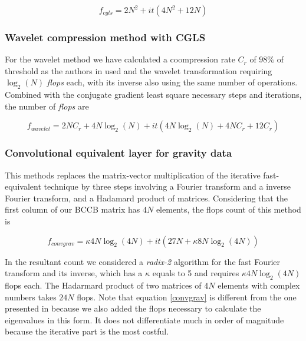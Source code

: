 \begin{equation}
	f_{cgls} = 2N^2 + it(4N^2 + 12N)
\label{cgls}
\end{equation}

\subsubsection{Wavelet compression method with CGLS \citep{li-oldenburg2010}}

For the wavelet method we have calculated a coompression rate $C_r$ of $98\%$ of threshold as the authors in \cite{li-oldenburg2010} used and the wavelet transformation requiring $\log_2(N)$ \textit{flops} each, with its inverse also using the same number of operations. Combined with the conjugate gradient least square necessary steps and iterations, the number of \textit{flops} are

\begin{equation}
	f_{wavelet} = 2NC_r + 4N\log_2(N) + it(4N\log_2(N) + 4NC_r + 12C_r)
\label{wavelet}
\end{equation}

\subsubsection{Convolutional equivalent layer for gravity data \citep{takahashi2020}}

This methods replaces the matrix-vector multiplication of the iterative fast-equivalent technique \citep{siqueira-etal2017} by three steps involving a Fourier transform and a inverse Fourier transform, 
and a Hadamard product of matrices. Considering that the first column of our BCCB matrix has $4N$ elements, the flops count of this method is

\begin{equation}
	f_{convgrav} = \kappa4N\log_2(4N) + it(27N + \kappa8N\log_2(4N))
\label{convgrav}
\end{equation}

In the resultant count we considered a \textit{radix-2} algorithm for the fast Fourier transform and its inverse, which has a $\kappa$ equals to 5 and requires $\kappa4N\log_2(4N)$ flops each. The Hadarmard product of two matrices of $4N$ elements with complex numbers takes $24N$ flops. Note that equation \ref{convgrav} is different from the one presented in \cite{takahashi2020} because we also added the flops necessary to calculate the  eigenvalues in this form. It does not differentiate much in order of magnitude because the iterative part is the most costful.

